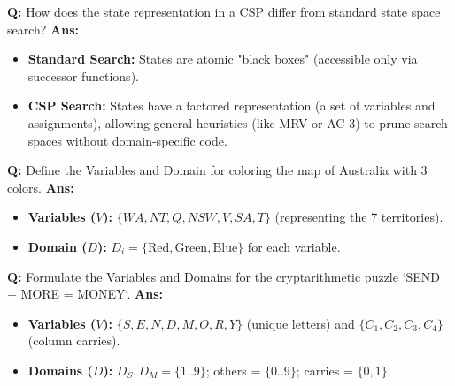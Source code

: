 \documentclass[10pt,a4paper,twocolumn]{article}
\begin{document}
\begin{tcolorbox}[
  colback=white,
  colframe=UnitColorFive,
  colbacktitle=gray!10!white,
  coltitle=black,
  fonttitle=\bfseries\sffamily\small,
  title={Unit V $\bullet$ Card 2: Standard Search vs. CSP Search},
  boxrule=1.2pt,
  arc=2mm,
  outer arc=2mm,
  boxsep=1.5mm,
  top=1mm,
  bottom=1mm,
  left=1.5mm,
  right=1.5mm,
  before skip=2.5mm,
  after skip=2.5mm
]
\textbf{Q:} How does the state representation in a CSP differ from standard state space search?
\tcbline
\textbf{Ans:} \begin{itemize}
  \item   \textbf{Standard Search:} States are atomic "black boxes" (accessible only via successor functions).
  \item   \textbf{CSP Search:} States have a factored representation (a set of variables and assignments), allowing general heuristics (like MRV or AC-3) to prune search spaces without domain-specific code.
\end{itemize}
\end{tcolorbox}


\begin{tcolorbox}[
  colback=white,
  colframe=UnitColorFive,
  colbacktitle=gray!10!white,
  coltitle=black,
  fonttitle=\bfseries\sffamily\small,
  title={Unit V $\bullet$ Card 3: Australia Map-Coloring Variables},
  boxrule=1.2pt,
  arc=2mm,
  outer arc=2mm,
  boxsep=1.5mm,
  top=1mm,
  bottom=1mm,
  left=1.5mm,
  right=1.5mm,
  before skip=2.5mm,
  after skip=2.5mm
]
\textbf{Q:} Define the Variables and Domain for coloring the map of Australia with 3 colors.
\tcbline
\textbf{Ans:} \begin{itemize}
  \item   \textbf{Variables ($V$):} $\{WA, NT, Q, NSW, V, SA, T\}$ (representing the 7 territories).
  \item   \textbf{Domain ($D$):} $D_i = \{\text{Red}, \text{Green}, \text{Blue}\}$ for each variable.
\end{itemize}
\end{tcolorbox}


\begin{tcolorbox}[
  colback=white,
  colframe=UnitColorFive,
  colbacktitle=gray!10!white,
  coltitle=black,
  fonttitle=\bfseries\sffamily\small,
  title={Unit V $\bullet$ Card 4: Cryptarithmetic Variables},
  boxrule=1.2pt,
  arc=2mm,
  outer arc=2mm,
  boxsep=1.5mm,
  top=1mm,
  bottom=1mm,
  left=1.5mm,
  right=1.5mm,
  before skip=2.5mm,
  after skip=2.5mm
]
\textbf{Q:} Formulate the Variables and Domains for the cryptarithmetic puzzle `SEND + MORE = MONEY`.
\tcbline
\textbf{Ans:} \begin{itemize}
  \item   \textbf{Variables ($V$):} $\{S, E, N, D, M, O, R, Y\}$ (unique letters) and $\{C_1, C_2, C_3, C_4\}$ (column carries).
  \item   \textbf{Domains ($D$):} $D_S, D_M = \{1..9\}$; others = $\{0..9\}$; carries = $\{0, 1\}$.
\end{itemize}
\end{tcolorbox}
\end{document}
